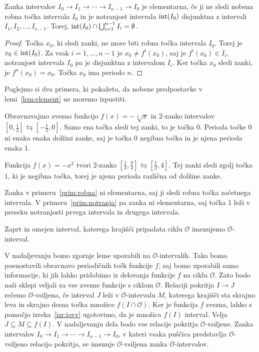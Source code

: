 \documentclass[../TG_magistrsko_delo_sections.tex]{subfiles}
\begin{document}
\begin{lema}\label{lem:element}
Zanka intervalov $I_0 \to I_1 \to \cdots \to I_{n-1} \to I_0$ je elementarna, če ji ne sledi nobena robna točka intervala $I_0$ in je notranjost intervala $\operatorname{int}(I_0)$ disjunktna z intervali $I_1, I_2,  \dots, I_{n-1}$. Torej, $\operatorname{int}(I_0) \cap \bigcup_{i=1}^{n-1}I_i = \emptyset$.
\end{lema}
\begin{proof}
Točka $x_0$, ki sledi zanki, ne more biti robna točka intervala $I_0$. Torej je $x_0 \in \operatorname{int}(I_0)$. Za vsak $i=1, \dots, n-1$ je $x_0 \neq f^i(x_0)$, saj je $f^i(x_0) \in I_i$, notranjost intervala $I_0$ pa je disjunktna z intervalom $I_i$. Ker točka $x_0$ sledi zanki, je $f^n(x_0)=x_0$. Točka $x_0$ ima periodo $n$.
\end{proof}

Poglejmo si dva primera, ki pokažeta, da nobene predpostavke v lemi~\ref{lem:element} ne moremo izpustiti.

\begin{primer}\label{prim:robna}
Obravnavajmo zvezno funkcijo $f(x) = -\sqrt[3]{x}$ in 2-zanko intervalov $\left[0, \frac{1}{2}\right] \leftrightarrows \left[-\frac{1}{2}, 0\right]$. Samo ena točka sledi tej zanki, to je točka 0. Perioda točke 0 ni enaka enaka dolžini zanke, saj je točka 0 negibna točka in je njena perioda enaka 1.
\end{primer}
\begin{primer}\label{prim:notranja}
Funkcija $f(x) = - x^2$ tvori $2$-zanko $\left[\frac{1}{4}, \frac{9}{4}\right] \leftrightarrows \left[\frac{1}{2}, 4\right]$. Tej zanki sledi zgolj točka $1$, ki je negibna točka, torej je njena perioda različna od dolžine zanke.
\end{primer}
Zanka v primeru~\ref{prim:robna} ni elementarna, saj ji sledi robna točka začetnega intervala. V primeru~\ref{prim:notranja} pa zanka ni elementarna, saj točka 1 leži v preseku notranjosti prvega intervala in drugega intervala. 

\begin{definicija}
Zaprt in omejen interval, katerega krajišči pripadata ciklu $\mathcal{O}$ imenujemo $\mathcal{O}$-interval. 
\end{definicija}
V nadaljevanju bomo zgornje leme uporabili na $\mathcal{O}$-intervalih. Tako bomo poenostavili obravnavo periodičnih točk funkcije $f$, saj bomo uporabili samo informacije, ki jih lahko pridobimo iz delovanja funkcije $f$ na ciklu $\mathcal{O}$. Zato bodo naši sklepi veljali za vse zvezne funkcije s ciklom $\mathcal{O}$. Relaciji pokritja $I \to J$ rečemo $\mathcal{O}$-vsiljena, če interval $J$ leži v $\mathcal{O}$-intervalu $M$, katerega krajišči sta skrajno leva in skrajno desna točka množice $f(I \cap \mathcal{O})$. Ker je funkcija $f$ zvezna, lahko s pomočjo izreka~\ref{izr:iovv} ugotovimo, da je množica $f(I)$ interval. Velja $J \subseteq M \subseteq f(I)$. V nadaljevanju dela bodo vse relacije pokritja $\mathcal{O}$-vsiljene. Zanka intervalov $I_0 \to I_1 \to \cdots \to I_{n-1} \to I_0$, v kateri vsaka puščica predstavlja $\mathcal{O}$-vsiljeno relacijo pokritja, se imenuje $\mathcal{O}$-vsiljena zanka $\mathcal{O}$-intervalov.
\end{document}
